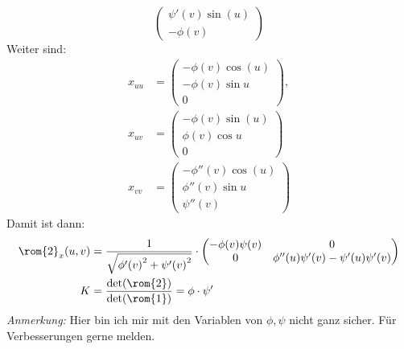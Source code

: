 \begin{problem*}[2a]
\begin{equation*}
\begin{pmatrix}
      \psi'(v) \sin(u) \\
      -\phi(v)
    \end{pmatrix}
  \end{equation*}
  Weiter sind:
  \begin{align*}
    x_{uu} &= \begin{pmatrix}
      -\phi(v)\cos(u) \\
      -\phi(v) \sin u \\
      0
    \end{pmatrix}, \\
    x_{uv} &= \begin{pmatrix}
      -\phi(v)\sin(u) \\
      \phi(v) \cos u \\
      0
    \end{pmatrix} \\
    x_{vv} &= \begin{pmatrix}
      -\phi''(v)\cos(u) \\
      \phi''(v) \sin u \\
      \psi''(v)
    \end{pmatrix}	
  \end{align*}
  Damit ist dann: 
  \begin{align*}
    \rom{2}_x(u,v) &= \frac{1}{\sqrt{ {\phi'(v)}^2 + {\psi'(v)}^2}} \cdot \begin{pmatrix}
      -\phi(v) \psi(v) & 0 \\
      0 & \phi''(u) \psi'(v) - \psi'(u)\psi'(v)
    \end{pmatrix} \\ 
    K &= \frac{\det(\rom{2})}{\det(\rom{1})} = \phi \cdot \psi'
  \end{align*}
  \emph{Anmerkung:} Hier bin ich mir mit den Variablen von \( \phi, \psi \) nicht ganz sicher. Für Verbesserungen gerne melden. %
\end{problem*}

